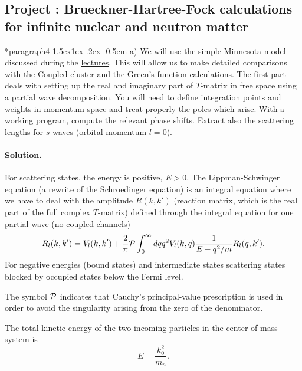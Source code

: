\documentclass[%
twoside,                 %
final,                   %
10pt]{article}
\makeatletter
\newenvironment{doconceexercise}{}{}
\newcounter{doconceexercisecounter}
\newcommand\subex{\@startsection*{paragraph}{4}{\z@}%
                  {1.5ex\@plus1ex \@minus.2ex}%
                  {-0.5em}%
                  {\normalfont\normalsize\bfseries}}
\makeatother
\begin{document}
\begin{doconceexercise}

\subsection*{Project \thedoconceexercisecounter: Brueckner-Hartree-Fock calculations for infinite nuclear and neutron matter}



\subex{a)}
We will use  the simple Minnesota model discussed during the \href{{https://github.com/NuclearTalent/Course2ManyBodyMethods/blob/master/doc/pub/cc/pdf/Lectures1-2_TALENT_NuclearMatter_GH.pdf}}{lectures}. This will allow us to make detailed comparisons  with the Coupled cluster and the Green's function calculations. The first part deals with setting up the real and imaginary part of $T$-matrix in free space using a partial wave decomposition. You will need to define integration points and weights in momentum space and treat properly the poles which arise. With a working program, compute the relevant phase shifts. Extract also the scattering lengths for $s$ waves (orbital momentum $l=0$).


\paragraph{Solution.}
For scattering states, the energy is positive, $E>0$. 
The Lippman-Schwinger equation (a rewrite of the Schroedinger equation)
is an integral equation
where we have to deal with the amplitude 
$R(k,k')$ (reaction matrix, which is the real part of  the full
complex $T$-matrix)
defined through the integral equation for one partial wave (no coupled-channels) 
\begin{equation}
    R_l(k,k') = V_l(k,k') +\frac{2}{\pi}{\cal P}
                \int_0^{\infty}dqq^2V_l(k,q)\frac{1}{E-q^2/m}R_l(q,k').
   \label{eq:ls1}
\end{equation}
For negative energies (bound states) and intermediate states scattering states blocked
by  occupied states below the Fermi level.

The symbol ${\cal P}$ indicates that Cauchy's principal-value prescription
is used in order to avoid the singularity arising from the zero of the denominator.


The total kinetic energy of the two 
incoming particles in the center-of-mass system
is 
\[
    E=\frac{k_0^2}{m_n}.
\]


\end{doconceexercise}
\end{document}
